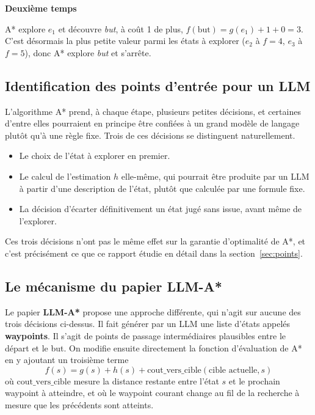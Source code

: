 \documentclass[11pt,a4paper]{article}
\begin{document}
\textbf{Deuxième temps}

A* explore $e_1$ et découvre \emph{but}, à coût 1
de plus, $f(\text{but}) = g(e_1)+1+0 = 3$. C'est désormais la plus petite valeur parmi les états à explorer ($e_2$ à $f=4$, $e_3$ à $f=5$), donc A* explore \emph{but} et s'arrête.

\subsection{Identification des points d'entrée pour un LLM}

L'algorithme A* prend, à chaque étape, plusieurs petites décisions, et
certaines d'entre elles pourraient en principe être confiées à un grand
modèle de langage plutôt qu'à une règle fixe. Trois de ces décisions se
distinguent naturellement.

\begin{itemize}
    \item Le choix de l'état à explorer en premier.
    \item Le calcul de l'estimation $h$ elle-même, qui pourrait être produite par un LLM à partir d'une description de l'état, plutôt que calculée par une formule fixe.
    \item La décision d'écarter définitivement un état jugé sans issue, avant même de l'explorer.
\end{itemize}

Ces trois décisions n'ont pas le même effet sur la garantie d'optimalité de A*, et c'est précisément ce que ce rapport étudie en détail dans la section~\ref{sec:points}.

\subsection{Le mécanisme du papier LLM-A*}

Le papier \textbf{LLM-A*} \cite{meng2024llmastar} propose une approche différente, qui n'agit sur aucune des trois décisions ci-dessus. Il fait générer par un LLM une liste d'états appelés \textbf{waypoints}. Il s'agit de points de passage intermédiaires plausibles entre le départ et le but. On modifie ensuite directement la fonction d'évaluation de A* en y ajoutant un troisième terme
\[
f(s) = g(s) + h(s) + \mathrm{cout\_vers\_cible}(\text{cible actuelle}, s)
\]
où $\mathrm{cout\_vers\_cible}$ mesure la distance restante entre l'état $s$ et le prochain waypoint à atteindre, et où le waypoint courant change au fil de la recherche à mesure que les précédents sont atteints. 
\end{document}
